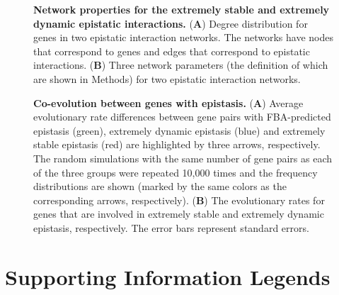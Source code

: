 \documentclass[10pt]{article}
\begin{document}
\begin{figure}[!htb]
\caption{
{\bf Network properties for the extremely stable and extremely dynamic
epistatic interactions.} (\textbf{A}) Degree distribution for genes in two
epistatic interaction networks. The networks have nodes that
correspond to genes and edges that correspond to epistatic
interactions. (\textbf{B}) Three network parameters (the definition of which
are shown in Methods) for two epistatic interaction networks.
}
\label{fig:eef4}
\end{figure}

\begin{figure}[!htb]
\caption{
{\bf Co-evolution between genes with epistasis.} (\textbf{A}) Average evolutionary
rate differences between gene pairs with FBA-predicted epistasis
(green), extremely dynamic epistasis (blue) and extremely stable
epistasis (red) are highlighted by three arrows, respectively. The
random simulations with the same number of gene pairs as each of the
three groups were repeated 10,000 times and the frequency
distributions are shown (marked by the same colors as the
corresponding arrows, respectively). (\textbf{B}) The evolutionary rates for
genes that are involved in extremely stable and extremely dynamic
epistasis, respectively. The error bars represent standard errors.
}
\label{fig:eef5}
\end{figure}


%
% 
%
%

\section*{Supporting Information Legends}
%
% 
\end{document}
